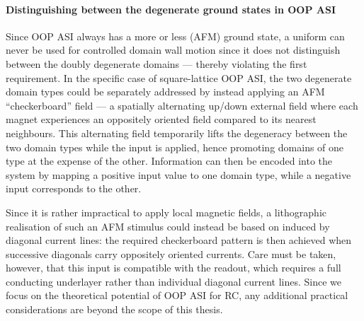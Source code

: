 \paragraph{Distinguishing between the degenerate ground states in OOP ASI}
Since OOP ASI always has a more or less  (AFM) ground state, a uniform  can never be used for controlled domain wall motion since it does not distinguish between the doubly degenerate domains --- thereby violating the first requirement.
In the specific case of square-lattice OOP ASI, the two degenerate domain types could be separately addressed by instead applying an AFM ``checkerboard'' field --- a spatially alternating up/down external field where each magnet experiences an oppositely oriented field compared to its nearest neighbours.
This alternating field temporarily lifts the degeneracy between the two domain types while the input is applied, hence promoting domains of one type at the expense of the other.
Information can then be encoded into the system by mapping a positive input value to one domain type, while a negative input corresponds to the other. \par
Since it is rather impractical to apply local magnetic fields, a lithographic realisation of such an AFM stimulus could instead be based on  induced by diagonal current lines: the required checkerboard pattern is then achieved when successive diagonals carry oppositely oriented currents.
Care must be taken, however, that this input is compatible with the  readout, which requires a full conducting underlayer rather than individual diagonal current lines.
Since we focus on the theoretical potential of OOP ASI for RC, any additional practical considerations are beyond the scope of this thesis. \\\par

